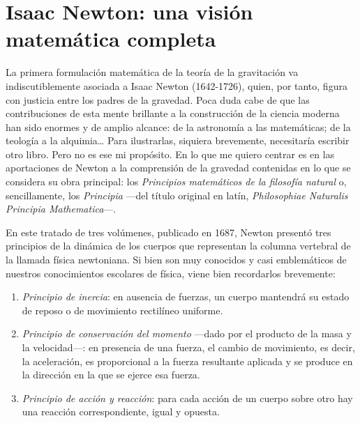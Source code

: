 \section{Isaac Newton: una visión matemática completa}\label{sec:02-newton}

La primera formulación matemática de la teoría de la gravitación va indiscutiblemente
asociada a Isaac Newton (1642-1726), quien, por tanto, figura con justicia entre los
padres de la gravedad. Poca duda cabe de que las contribuciones de esta mente brillante
a la construcción de la ciencia moderna han sido enormes y de amplio alcance: de la
astronomía a las matemáticas; de la teología a la alquimia… Para ilustrarlas, siquiera
brevemente, necesitaría escribir otro libro. Pero no es ese mi propósito. En lo que
me quiero centrar es en las aportaciones de Newton a la comprensión de la gravedad
contenidas en lo que se considera su obra principal: los \emph{Principios matemáticos
de la filosofía natural} o, sencillamente, los \emph{Principia}
---del título original en latín, \emph{Philosophiae Naturalis Principia
Mathematica}---.

En este tratado de tres volúmenes, publicado en 1687, Newton presentó tres principios
de la dinámica de los cuerpos que representan la columna vertebral de la llamada
física newtoniana. Si bien son muy conocidos y casi emblemáticos de nuestros
conocimientos escolares de física, viene bien recordarlos brevemente:

\begin{enumerate}
\item
\emph{Principio de inercia}: en ausencia de fuerzas,
un cuerpo mantendrá su estado de reposo o de movimiento rectilíneo uniforme.
\item
\emph{Principio de conservación del momento}
---dado por el producto de la masa y la velocidad---: en presencia de una fuerza,
el cambio de movimiento, es decir, la aceleración, es proporcional a la fuerza
resultante aplicada y se produce en la dirección en la que se ejerce esa fuerza.
\item
\emph{Principio de acción y reacción}:
para cada acción de un cuerpo sobre otro hay una reacción correspondiente, igual
y opuesta.
\end{enumerate}

